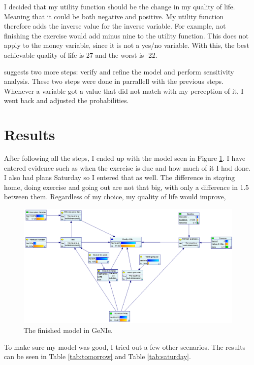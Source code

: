 \documentclass{article}
\begin{document}
    I decided that my utility function should be the change in my quality of
    life. Meaning that it could be both negative and positive. My utility
    function therefore adds the inverse value for the inverse variable. For
    example, not finishing the exercise would add minus nine to the utility
    function. This does not apply to the money variable, since it is not a
    yes/no variable. With this, the best achievable quality of life is 27 and
    the worst is -22.

     suggests two more steps: verify and refine the
    model and perform sensitivity analysis. These two steps were done in
    parrallell with the previous steps. Whenever a variable got a value that
    did not match with my perception of it, I went back and adjusted the
    probabilities.



\section*{Results}
    After following all the steps, I ended up with the model seen in Figure
    \ref{fig:genie}. I have entered evidence such as when the exercise is due
    and how much of it I had done. I also had plans Saturday so I entered that
    as well. The difference in staying home, doing exercise and going out are
    not that big, with only a difference in 1.5 between them. Regardless of my
    choice, my quality of life would improve,

    \begin{figure}[ht]
        \centering
        \includegraphics[width=\linewidth]{genie.png}
        \caption{The finished model in GeNIe.}
        \label{fig:genie}
    \end{figure}

    To make sure my model was good, I tried out a few other scenarios. The
    results can be seen in Table \ref{tab:tomorrow} and Table
    \ref{tab:saturday}.
\end{document}
